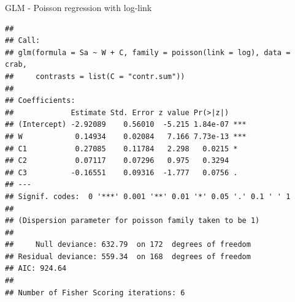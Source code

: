 \documentclass[
  ignorenonframetext,
]{beamer}
\newenvironment{Shaded}{\begin{snugshade}}{\end{snugshade}}
\newcommand{\AttributeTok}[1]{\textcolor[rgb]{0.13,0.29,0.53}{#1}}
\newcommand{\CommentTok}[1]{\textcolor[rgb]{0.56,0.35,0.01}{\textit{#1}}}
\newcommand{\DecValTok}[1]{\textcolor[rgb]{0.00,0.00,0.81}{#1}}
\newcommand{\FunctionTok}[1]{\textcolor[rgb]{0.13,0.29,0.53}{\textbf{#1}}}
\newcommand{\NormalTok}[1]{#1}
\newcommand{\OtherTok}[1]{\textcolor[rgb]{0.56,0.35,0.01}{#1}}
\newcommand{\SpecialCharTok}[1]{\textcolor[rgb]{0.81,0.36,0.00}{\textbf{#1}}}
\newcommand{\StringTok}[1]{\textcolor[rgb]{0.31,0.60,0.02}{#1}}
\begin{document}
\begin{frame}[fragile]
\begin{block}{GLM - Poisson regression with log-link}
\protect\hypertarget{glm---poisson-regression-with-log-link}{}
\begin{Shaded}
\end{Shaded}

\begin{verbatim}
## 
## Call:
## glm(formula = Sa ~ W + C, family = poisson(link = log), data = crab, 
##     contrasts = list(C = "contr.sum"))
## 
## Coefficients:
##             Estimate Std. Error z value Pr(>|z|)    
## (Intercept) -2.92089    0.56010  -5.215 1.84e-07 ***
## W            0.14934    0.02084   7.166 7.73e-13 ***
## C1           0.27085    0.11784   2.298   0.0215 *  
## C2           0.07117    0.07296   0.975   0.3294    
## C3          -0.16551    0.09316  -1.777   0.0756 .  
## ---
## Signif. codes:  0 '***' 0.001 '**' 0.01 '*' 0.05 '.' 0.1 ' ' 1
## 
## (Dispersion parameter for poisson family taken to be 1)
## 
##     Null deviance: 632.79  on 172  degrees of freedom
## Residual deviance: 559.34  on 168  degrees of freedom
## AIC: 924.64
## 
## Number of Fisher Scoring iterations: 6
\end{verbatim}
\end{block}
\end{frame}
\end{document}
